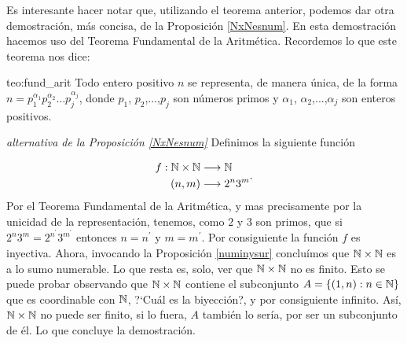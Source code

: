 Es interesante hacer notar que, utilizando el teorema anterior,
podemos dar otra demostración, más concisa, de la
Proposición \vref{NxNesnum}. En esta demostración hacemos uso del Teorema Fundamental de la
Aritmética. Recordemos lo que este teorema nos dice:


\begin{teorema}{teo:fund_arit} Todo entero positivo $n$ se representa, de
manera única, de la forma $n=p_1^{\alpha_1}p_2^{\alpha_2}\dots
p_j^{\alpha_j}$, donde $p_1$, $p_2$,...,$p_j$ son números primos
y $\alpha_1$, $\alpha_2$,...,$\alpha_j$ son enteros positivos.
\end{teorema}

\begin{demo} \emph{alternativa de la Proposición \ref{NxNesnum}}
Definimos la siguiente función

\[
\begin{split}
f:\mathbb{N}\times\mathbb{N}&\longrightarrow\mathbb{N}\\
 (n,m)&\longrightarrow 2^n3^m\\
 \end{split}.
 \]
Por el Teorema Fundamental de la Aritmética, y mas precisamente
por la unicidad de la representación, tenemos, como $2$ y $3$
son primos, que si $2^n3^m=2^{n^{\prime}}3^{m^{\prime}}$ entonces
$n=n^{\prime}$ y $m=m^{\prime}$. Por consiguiente la función $f$
es inyectiva. Ahora, invocando la Proposición \vref{numinysur}
concluímos que $\mathbb{N}\times\mathbb{N}$ es a lo sumo numerable. Lo que
resta es, solo, ver que $\mathbb{N}\times\mathbb{N}$ no es finito. Esto se puede
probar observando que $\mathbb{N}\times\mathbb{N}$ contiene el subconjunto
$A=\{(1,n):n\in\mathbb{N}\}$ que es coordinable con $\mathbb{N}$, ?`Cuál es la
biyección?, y por consiguiente infinito. Así,
$\mathbb{N}\times\mathbb{N}$ no puede ser finito, si lo fuera, $A$ también lo
sería, por ser un subconjunto de él. Lo que concluye la
demostración.
\end{demo}

